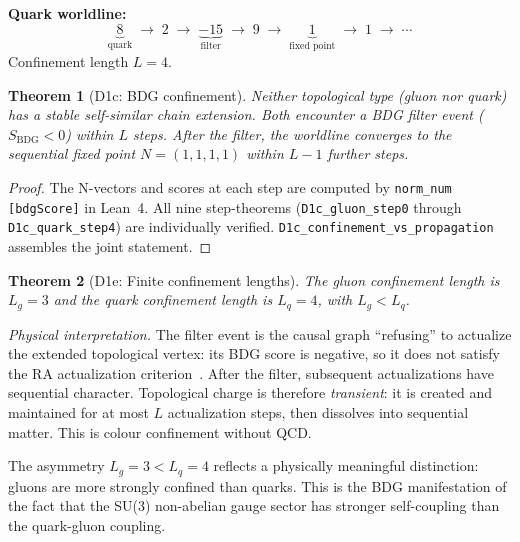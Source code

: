 \documentclass[11pt,a4paper]{article}
\newtheorem{theorem}{Theorem}[section]
\newcommand{\SBDG}{S_{\mathrm{BDG}}}
\begin{document}
\medskip
\noindent\textbf{Quark worldline:}
\[
  \underbrace{8}_{\text{quark}} \;\to\; 2 \;\to\;
  \underbrace{-15}_{\text{filter}} \;\to\;
  9 \;\to\; \underbrace{1}_{\text{fixed point}} \;\to\; 1 \;\to\; \cdots
\]
Confinement length $L = 4$.

\begin{theorem}[D1c: BDG confinement]
\label{thm:D1c}
Neither topological type (gluon nor quark) has a stable self-similar
chain extension. Both encounter a BDG filter event ($\SBDG < 0$)
within $L$ steps. After the filter, the worldline converges to the
sequential fixed point $N=(1,1,1,1)$ within $L-1$ further steps.
\end{theorem}

\begin{proof}
The N-vectors and scores at each step are computed by
\texttt{norm\_num [bdgScore]} in Lean~4. All nine step-theorems
(\texttt{D1c\_gluon\_step0} through \texttt{D1c\_quark\_step4}) are
individually verified. \texttt{D1c\_confinement\_vs\_propagation}
assembles the joint statement.
\end{proof}

\begin{theorem}[D1e: Finite confinement lengths]
\label{thm:D1e}
The gluon confinement length is $L_g = 3$ and the quark confinement
length is $L_q = 4$, with $L_g < L_q$.
\end{theorem}

\noindent\emph{Physical interpretation.} The filter event is the causal
graph ``refusing'' to actualize the extended topological vertex: its BDG
score is negative, so it does not satisfy the RA actualization
criterion~\citep{Sandeman2026RAQM}. After the filter, subsequent
actualizations have sequential character. Topological charge is
therefore \emph{transient}: it is created and maintained for at most
$L$ actualization steps, then dissolves into sequential matter.
This is colour confinement without QCD.

The asymmetry $L_g = 3 < L_q = 4$ reflects a physically meaningful
distinction: gluons are more strongly confined than quarks. This is
the BDG manifestation of the fact that the SU(3) non-abelian gauge
sector has stronger self-coupling than the quark-gluon coupling.
\end{document}
